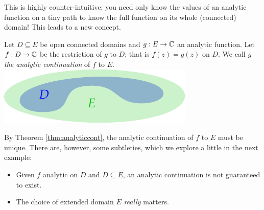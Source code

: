 This is highly counter-intuitive; you need only know the values of an analytic function on a tiny path to know the full function on its whole (connected) domain! This leads to a new concept.

\begin{defn}[lower separated=false, sidebyside, sidebyside align=top seam, sidebyside gap=0pt, righthand width=0.38\linewidth]{}{}
Let $D\subseteq E$ be open connected domains and $g:E\to \mathbb{C}$ an analytic function. Let $f:D\to\mathbb{C}$ be the restriction of $g$ to $D$; that is $f(z)=g(z)$ on $D$.\smallbreak
We call $g$ \emph{the analytic continuation} of $f$ to $E$.\tcblower
\flushright\includegraphics{analytic-topology3}
\end{defn}

By Theorem \ref{thm:analyticcont}, the analytic continuation of $f$ to $E$ must be unique. There are, however, some subtleties, which we explore a little in the next example:
\begin{itemize}\itemsep2pt
  \item Given $f$ analytic on $D$ and $D\subseteq E$, an analytic continuation is not guaranteed to exist.
  \item The choice of extended domain $E$ \emph{really} matters.
\end{itemize}

